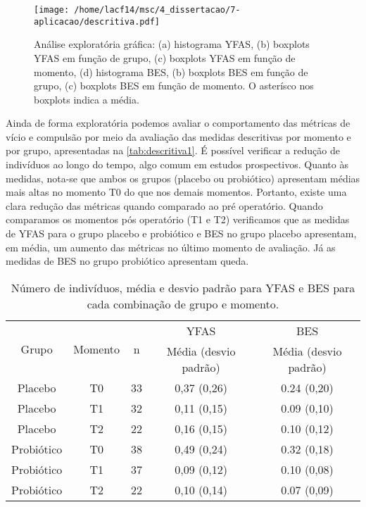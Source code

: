\begin{figure}[H]
\centering
\texttt{[image: /home/lacf14/msc/4\_dissertacao/7-aplicacao/descritiva.pdf]}
\caption{Análise exploratória gráfica: (a) histograma YFAS, (b) boxplots YFAS em função de grupo, (c) boxplots YFAS em função de momento, (d) histograma BES, (b) boxplots BES em função de grupo, (c) boxplots BES em função de momento. O asterísco nos boxplots indica a média.}
\label{fig:descritiva2}
\end{figure}

Ainda de forma exploratória podemos avaliar o comportamento das métricas de vício e compulsão por meio da avaliação das medidas descritivas por momento e por grupo, apresentadas na \autoref{tab:descritiva1}. É possível verificar a redução de indivíduos ao longo do tempo, algo comum em estudos prospectivos. Quanto às medidas, nota-se que ambos os grupos (placebo ou probiótico) apresentam médias mais altas no momento T0 do que nos demais momentos. Portanto, existe uma clara redução das métricas quando comparado ao pré operatório. Quando comparamos os momentos pós operatório (T1 e T2) verificamos que as medidas de YFAS para o grupo placebo e probiótico e BES no grupo placebo apresentam, em média, um aumento das métricas no último momento de avaliação. Já as medidas de BES no grupo probiótico apresentam queda.

\begin{table}[H]
\centering
\begin{tabular}{ccccc}
\hline
\multirow{2}{*}{Grupo} & \multirow{2}{*}{Momento} & \multirow{2}{*}{n} & YFAS                  & BES                   \\ \cline{4-5} 
                       &                          &                    & Média (desvio padrão) & Média (desvio padrão) \\ \hline
Placebo                & T0                       & 33                 & 0,37 (0,26)           & 0.24 (0,20)           \\
Placebo                & T1                       & 32                 & 0,11 (0,15)           & 0.09 (0,10)           \\
Placebo                & T2                       & 22                 & 0,16 (0,15)           & 0.10 (0,12)           \\
Probiótico             & T0                       & 38                 & 0,49 (0,24)           & 0.32 (0,18)           \\
Probiótico             & T1                       & 37                 & 0,09 (0,12)           & 0.10 (0,08)           \\
Probiótico             & T2                       & 22                 & 0,10 (0,14)           & 0.07 (0,09)           \\ \hline
\end{tabular}
\caption{Número de indivíduos, média e desvio padrão para YFAS e BES para cada combinação de grupo e momento.}
\label{tab:descritiva1}
\end{table}

